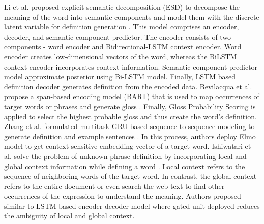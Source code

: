 Li et al. proposed explicit semantic decomposition (ESD) to decompose the
meaning of the word into semantic components and model them with the discrete
latent variable for definition generation \cite{li_explicit_2020}. This model
comprises an encoder, decoder, and semantic component predictor. The encoder
consists of two components - word encoder and Bidirectional-LSTM context
encoder. Word encoder creates low-dimensional vectors of the word, whereas the
BiLSTM context encoder incorporates context information. Semantic component
predictor model approximate posterior using Bi-LSTM model. Finally, LSTM based
definition decoder generates definition from the encoded data. Bevilacqua et al.
propose a span-based encoding model (BART) that is used to map occurrences of
target words or phrases and generate gloss \cite{bevilacqua_generationary_2020}.
Finally, Gloss Probability Scoring is applied to select the highest probable
gloss and thus create the word's definition. Zhang et al. formulated multitask
GRU-based sequence to sequence modeling to generate definition and example
sentences \cite{zhang_improving_2020}. In this process, authors deploy Elmo
model to get context sensitive embedding vector of a target word. Ishiwatari et
al. solve the problem of unknown phrase definition by incorporating local and
global context information while defining a word
\cite{ishiwatari_learning_2019}. Local context refers to the sequence of
neighboring words of the target word. In contrast, the global context refers to
the entire document or even search the web text to find other occurrences of the
expression to understand the meaning. Authors proposed similar to LSTM based
encoder-decoder model where gated unit deployed reduces the ambiguity of local
and global context.

